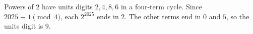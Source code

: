 Powers of $2$ have units digits $2,4,8,6$ in a four-term cycle. Since $2025\equiv1\pmod4$, each $2^{2025}$ ends in $2$. The other terms end in $0$ and $5$, so the units digit is $\boxed9$.
